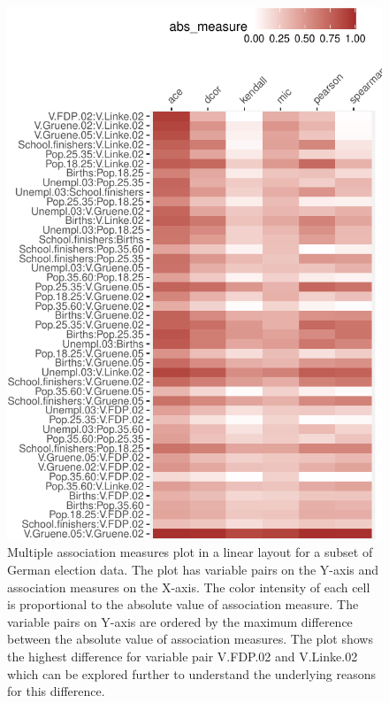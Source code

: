 \begin{Schunk}
\begin{figure}
{\centering \includegraphics{rj_paper_files/figure-latex/compare-linear-heatmap-1} 

}

\caption[Multiple association measures plot in a linear layout for a subset of German election data]{Multiple association measures plot in a linear layout for a subset of German election data. The plot has variable pairs on the Y-axis and association measures on the X-axis. The color intensity of each cell is proportional to the absolute value of association measure. The variable pairs on Y-axis are ordered by the maximum difference between the absolute value of association measures. The plot shows the highest difference for variable pair V.FDP.02 and V.Linke.02 which can be explored further to understand the underlying reasons for this difference.}\label{fig:compare-linear-heatmap}
\end{figure}
\end{Schunk}

